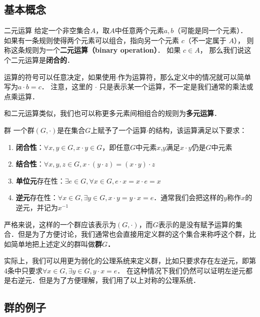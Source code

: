 
\subsection{基本概念}

\begin{definition}{二元运算}
给定一个非空集合$A$，取$A$中任意两个元素$a, b$（可能是同一个元素）． 如果有一条规则使得两个元素可以组合，指向另一个元素 $c$（不一定属于 $A$）， 则称这条规则为一个\textbf{二元运算（binary operation）}． 如果 $c\in A$， 那么我们说这个二元运算是\textbf{闭合的}．
\end{definition}

运算的符号可以任意决定，如果使用$\cdot$作为运算符，那么定义中的情况就可以简单写为$a· b=c$． 注意，这里的 $\cdot$ 只是表示某一个运算，不一定是我们通常的乘法或点乘运算．

和二元运算类似，我们也可以称更多元素间相组合的规则为\textbf{多元运算}．

\begin{definition}{群}
一个群$(G, \cdot)$是在集合$G$上赋予了一个运算$\cdot$的结构，该运算满足以下要求：\\

\begin{enumerate}
\item \textbf{闭合性}：$∀x, y∈ G, x· y∈ G$，即任意$G$中元素$x$,$y$满足$x· y$仍是$G$中元素
\item \textbf{结合性}：$∀ x, y, z\in G, x·(y· z)=(x· y)· z$
\item \textbf{单位元}存在性：$∃ e\in G, ∀ x∈ G, e· x=x· e=x$
\item \textbf{逆元}存在性：$∀ x∈ G, ∃ y∈ G, x· y=y· x=e$．通常我们会把这样的$y$称作$x$的逆元，并记为$x^{-1}$\\


\end{enumerate}
严格来说，这样的一个群应该表示为$(G,\cdot)$，而$G$表示的是没有赋予运算的集合．但是为了方便讨论，我们通常也会直接用定义群的这个集合来称呼这个群，比如简单地把上述定义的群叫做\textbf{群$G$．}
\end{definition}

实际上，我们可以用更为弱化的公理系统来定义群，比如只要求存在左逆元，即第4条中只要求$∀ x∈ G, ∃ y∈ G, y· x=e$． 在这种情况下我们仍然可以证明左逆元都是右逆元．但是为了方便理解，我们用了以上对称的公理系统．

\subsection{群的例子}


